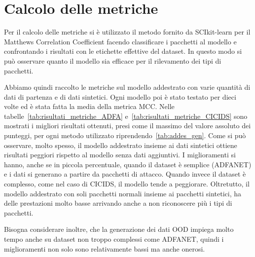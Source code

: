\section{Calcolo delle metriche}

Per il calcolo delle metriche si è utilizzato il metodo fornito da SCIkit-learn per il Matthews Correlation Coefficient facendo classificare i pacchetti al modello e confrontando i risultati con le etichette effettive del dataset. In questo modo si può osservare quanto il modello sia efficace per il rilevamento dei tipi di pacchetti.

Abbiamo quindi raccolto le metriche sul modello addestrato con varie quantità di dati di partenza e di dati sintetici. Ogni modello poi è stato testato per dieci volte ed è stata fatta la media della metrica MCC. Nelle tabelle~\ref{tab:risultati_metriche_ADFA} e~\ref{tab:risultati_metriche_CICIDS} sono mostrati i migliori risultati ottenuti, presi come il massimo del valore assoluto dei punteggi, per ogni metodo utilizzato riprendendo~\ref{tab:addes_gen}. Come si può osservare, molto spesso, il modello addestrato insieme ai dati sintetici ottiene risultati peggiori rispetto al modello senza dati aggiuntivi. I miglioramenti si hanno, anche se in piccola percentuale, quando il dataset è semplice (ADFANET) e i dati si generano a partire da pacchetti di attacco.
Quando invece il dataset è complesso, come nel caso di CICIDS, il modello tende a peggiorare.
Oltretutto, il modello addestrato con soli pacchetti normali insieme ai pacchetti sintetici, ha delle prestazioni molto basse arrivando anche a non riconoscere più i tipi di pacchetti.

Bisogna considerare inoltre, che la generazione dei dati OOD impiega molto tempo  anche su dataset non troppo complessi come ADFANET, quindi i miglioramenti non solo sono relativamente bassi ma anche onerosi.


\begin{table}\centering\setlength\tabcolsep{3.5pt}\renewcommand{}
  \noindent{}
\caption{\label{tab:risultati_metriche_ADFA} Risultati migliori ottenuti per ogni metodo sul dataset ADFANET}
\end{table}

